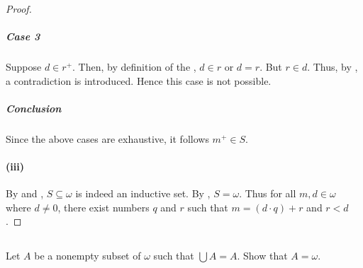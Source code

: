 \documentclass{report}
\begin{document}
\begin{proof}
      \subparagraph{Case 3}%

        Suppose $d \in r^+$.
        Then, by definition of the , $d \in r$ or
          $d = r$.
        But $r \in d$.
        Thus, by , a contradiction
          is introduced.
        Hence this case is not possible.

      \subparagraph{Conclusion}%

        Since the above cases are exhaustive, it follows $m^+ \in S$.

    \paragraph{(iii)}%

      By  and ,
        $S \subseteq \omega$ is indeed an inductive set.
      By , $S = \omega$.
      Thus for all $m, d \in \omega$ where $d \neq 0$, there exist numbers $q$
        and $r$ such that $m = (d \cdot q) + r$ and $r < d$.

  \end{proof}

\subsection{}%

  Let $A$ be a nonempty subset of $\omega$ such that $\bigcup A = A$.
  Show that $A = \omega$.
\end{document}
